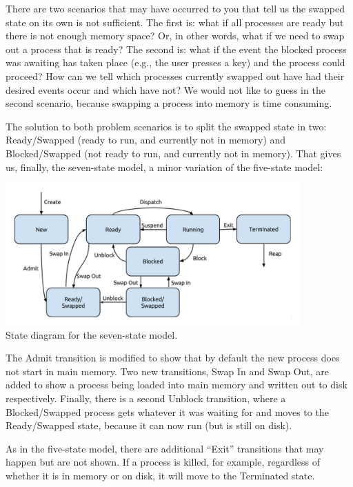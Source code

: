 There are two scenarios that may have occurred to you that tell us the swapped state on its own is not sufficient. The first is: what if all processes are ready but there is not enough memory space? Or, in other words, what if we need to swap out a process that is ready? The second is: what if the event the blocked process was awaiting has taken place (e.g., the user presses a key) and the process could proceed? How can we tell which processes currently swapped out have had their desired events occur and which have not? We would not like to guess in the second scenario, because swapping a process into memory is time consuming.

The solution to both problem scenarios is to split the swapped state in two: Ready/Swapped (ready to run, and currently not in memory) and Blocked/Swapped (not ready to run, and currently not in memory). That gives us, finally, the seven-state model, a minor variation of the five-state model:

\begin{center}
	\includegraphics[width=0.85\textwidth]{images/7-state-model.png}\\
	State diagram for the seven-state model.
\end{center}

The Admit transition is modified to show that by default the new process does not start in main memory. Two new transitions, Swap In and Swap Out, are added to show a process being loaded into main memory and written out to disk respectively. Finally, there is a second Unblock transition, where a Blocked/Swapped process gets whatever it was waiting for and moves to the Ready/Swapped state, because it can now run (but is still on disk).

As in the five-state model, there are additional ``Exit'' transitions that may happen but are not shown. If a process is killed, for example, regardless of whether it is in memory or on disk, it will move to the Terminated state.





